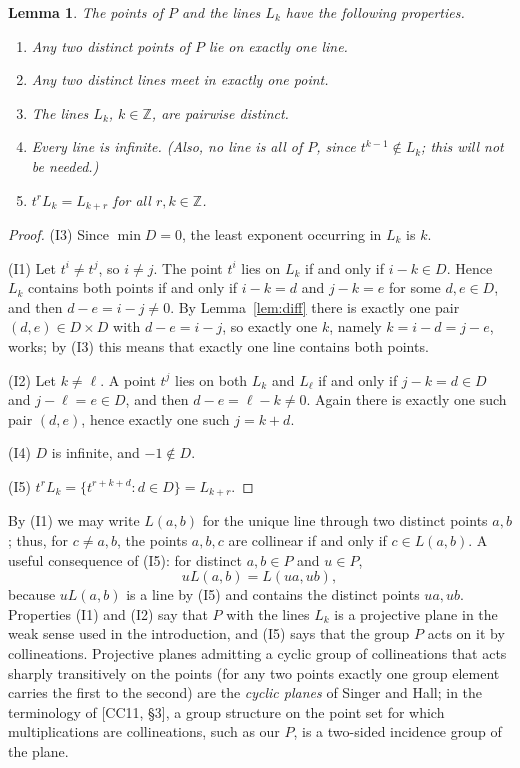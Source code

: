 \documentclass[11pt]{article}
\theoremstyle{plain}
\newtheorem{lemma}[theorem]{Lemma}
\theoremstyle{definition}
\newcommand{\Z}{\mathbb{Z}}
\begin{document}

\begin{lemma}\label{lem:incidence}
The points of $P$ and the lines $L_k$ have the following properties.
\begin{enumerate}
\item[(I1)] Any two distinct points of $P$ lie on exactly one line.
\item[(I2)] Any two distinct lines meet in exactly one point.
\item[(I3)] The lines $L_k$, $k\in\Z$, are pairwise distinct.
\item[(I4)] Every line is infinite.  (Also, no line is all of $P$, since
$t^{k-1}\notin L_k$; this will not be needed.)
\item[(I5)] $t^rL_k=L_{k+r}$ for all $r,k\in\Z$.
\end{enumerate}
\end{lemma}
\begin{proof}
(I3) Since $\min D=0$, the least exponent occurring in $L_k$ is $k$.

(I1) Let $t^i\neq t^j$, so $i\neq j$.  The point $t^i$ lies on $L_k$ if
and only if $i-k\in D$.  Hence $L_k$ contains both points if and only if
$i-k=d$ and $j-k=e$ for some $d,e\in D$, and then $d-e=i-j\neq0$.  By
Lemma~\ref{lem:diff} there is exactly one pair $(d,e)\in D\times D$ with
$d-e=i-j$, so exactly one $k$, namely $k=i-d=j-e$, works; by (I3) this
means that exactly one line contains both points.

(I2) Let $k\neq\ell$.  A point $t^j$ lies on both $L_k$ and $L_\ell$ if
and only if $j-k=d\in D$ and $j-\ell=e\in D$, and then
$d-e=\ell-k\neq0$.  Again there is exactly one such pair $(d,e)$, hence
exactly one such $j=k+d$.

(I4) $D$ is infinite, and $-1\notin D$.

(I5) $t^r L_k=\{t^{r+k+d}:d\in D\}=L_{k+r}$.
\end{proof}

By (I1) we may write $L(a,b)$ for the unique line through two distinct
points $a,b$; thus, for $c\neq a,b$, the points $a,b,c$ are collinear if
and only if $c\in L(a,b)$.  A useful consequence of (I5): for distinct
$a,b\in P$ and $u\in P$,
\begin{equation}\label{eq:translation}
 uL(a,b)=L(ua,ub),
\end{equation}
because $uL(a,b)$ is a line by (I5) and contains the distinct points
$ua,ub$.  Properties (I1) and (I2) say that $P$ with the lines $L_k$ is
a projective plane in the weak sense used in the introduction, and (I5)
says that the group $P$ acts on it by collineations.  Projective planes admitting a
cyclic group of collineations that acts sharply transitively on the
points (for any two points exactly one group element carries the first
to the second) are the \emph{cyclic planes} of Singer and Hall; in the
terminology of [CC11, \S3], a group structure on the point set for
which multiplications are collineations, such as our $P$, is a
two-sided incidence group of the plane.
\end{document}
